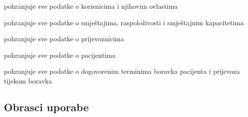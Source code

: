 \begin{packed_enum}
					\item  {}
				\begin{packed_enum}
					\item pohranjuje sve podatke o korisnicima i njihovim ovlastima
					\item pohranjuje sve podatke o smještajima, raspoloživosti i smještajnim kapacitetima
					\item pohranjuje sve podatke o prijevoznicima
					\item pohranjuje sve podatke o pacijentima
					\item pohranjuje sve podatke o dogovorenim terminima boravka pacijenta i prijevoza tijekom boravka
				\end{packed_enum}
			\end{packed_enum}
			\eject 
			
			
			
			\subsection{Obrasci uporabe}
					
